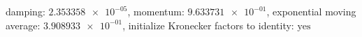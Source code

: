 damping: $\num[scientific-notation=true]{2.353358e-05}$, momentum: $\num[scientific-notation=true]{9.633731e-01}$, exponential moving average: $\num[scientific-notation=true]{3.908933e-01}$, initialize Kronecker factors to identity: $\text{yes}$